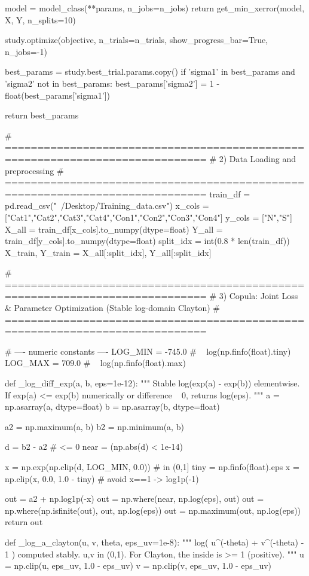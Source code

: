         model = model_class(**params, n_jobs=n_jobs)
        return get_min_xerror(model, X, Y, n_splits=10)

    study.optimize(objective, n_trials=n_trials, show_progress_bar=True, n_jobs=-1)

    best_params = study.best_trial.params.copy()
    if 'sigma1' in best_params and 'sigma2' not in best_params:
        best_params['sigma2'] = 1 - float(best_params['sigma1'])

    return best_params


# =============================================================================
# 2) Data Loading and preprocessing
# =============================================================================
train_df = pd.read_csv("~/Desktop/Training_data.csv")
x_cols = ["Cat1","Cat2","Cat3","Cat4","Con1","Con2","Con3","Con4"]
y_cols = ["N","S"]
X_all = train_df[x_cols].to_numpy(dtype=float)
Y_all = train_df[y_cols].to_numpy(dtype=float)
split_idx = int(0.8 * len(train_df))
X_train, Y_train = X_all[:split_idx], Y_all[:split_idx]


# =============================================================================
# 3) Copula: Joint Loss & Parameter Optimization (Stable log-domain Clayton)
# =============================================================================

# ---- numeric constants ----
LOG_MIN = -745.0  # ~ log(np.finfo(float).tiny)
LOG_MAX =  709.0  # ~ log(np.finfo(float).max)

def _log_diff_exp(a, b, eps=1e-12):
    """
    Stable log(exp(a) - exp(b)) elementwise.
    If exp(a) <= exp(b) numerically or difference ~ 0, returns log(eps).
    """
    a = np.asarray(a, dtype=float)
    b = np.asarray(b, dtype=float)

    a2 = np.maximum(a, b)
    b2 = np.minimum(a, b)

    d = b2 - a2  # <= 0
    near = (np.abs(d) < 1e-14)

    x = np.exp(np.clip(d, LOG_MIN, 0.0))  # in (0,1]
    tiny = np.finfo(float).eps
    x = np.clip(x, 0.0, 1.0 - tiny)       # avoid x==1 -> log1p(-1)

    out = a2 + np.log1p(-x)
    out = np.where(near, np.log(eps), out)
    out = np.where(np.isfinite(out), out, np.log(eps))
    out = np.maximum(out, np.log(eps))
    return out


def _log_a_clayton(u, v, theta, eps_uv=1e-8):
    """
    log( u^(-theta) + v^(-theta) - 1 ) computed stably.
    u,v in (0,1). For Clayton, the inside is >= 1 (positive).
    """
    u = np.clip(u, eps_uv, 1.0 - eps_uv)
    v = np.clip(v, eps_uv, 1.0 - eps_uv)

